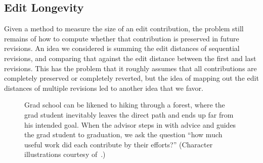 \subsection{Edit Longevity}

Given a method to measure the size of an edit contribution,
the problem still remains of how to compute whether that
contribution is preserved in future revisions.
An idea we considered is summing the edit distances of
sequential revisions, and comparing that against the edit
distance between the first and last revisions.
This has the problem that it roughly assumes that all
contributions are completely preserved or completely
reverted, but the idea of mapping out the edit distances of
multiple revisions led to another idea that we favor.


\begin{figure}[tbph]
  \centering
  \caption[Grad school is like hiking through the forest]{%
    Grad school can be likened to hiking through a forest, where the
    grad student inevitably leaves the direct path and ends up far from
    his intended goal.  When the advisor steps in with advice and guides
    the grad student to graduation, we ask the question ``how much
    useful work did each contribute by their efforts?''
    (Character illustrations courtesy of~\cite{Cham2009}.)
  }
  \label{fig-gradhike}
\end{figure}

